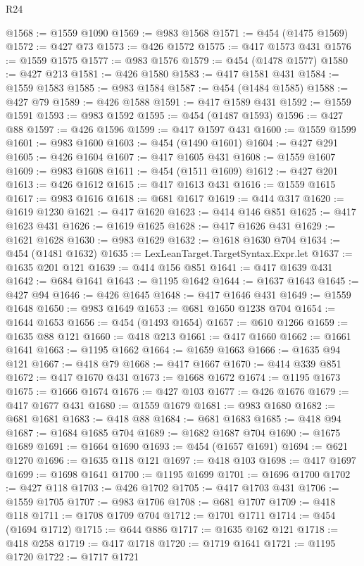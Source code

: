 \begin{lexlean}{R24}
\begin{coremodule}
@1568 := @1559 @1090
@1569 := @983 @1568
@1571 := @454 (@1475 @1569)
@1572 := @427 @73
@1573 := @426 @1572
@1575 := @417 @1573 @431
@1576 := @1559 @1575
@1577 := @983 @1576
@1579 := @454 (@1478 @1577)
@1580 := @427 @213
@1581 := @426 @1580
@1583 := @417 @1581 @431
@1584 := @1559 @1583
@1585 := @983 @1584
@1587 := @454 (@1484 @1585)
@1588 := @427 @79
@1589 := @426 @1588
@1591 := @417 @1589 @431
@1592 := @1559 @1591
@1593 := @983 @1592
@1595 := @454 (@1487 @1593)
@1596 := @427 @88
@1597 := @426 @1596
@1599 := @417 @1597 @431
@1600 := @1559 @1599
@1601 := @983 @1600
@1603 := @454 (@1490 @1601)
@1604 := @427 @291
@1605 := @426 @1604
@1607 := @417 @1605 @431
@1608 := @1559 @1607
@1609 := @983 @1608
@1611 := @454 (@1511 @1609)
@1612 := @427 @201
@1613 := @426 @1612
@1615 := @417 @1613 @431
@1616 := @1559 @1615
@1617 := @983 @1616
@1618 := @681 @1617
@1619 := @414 @317
@1620 := @1619 @1230
@1621 := @417 @1620
@1623 := @414 @146 @851
@1625 := @417 @1623 @431
@1626 := @1619 @1625
@1628 := @417 @1626 @431
@1629 := @1621 @1628
@1630 := @983 @1629
@1632 := @1618 @1630 @704
@1634 := @454 (@1481 @1632)
@1635 := LexLeanTarget.TargetSyntax.Expr.let
@1637 := @1635 @201 @121
@1639 := @414 @156 @851
@1641 := @417 @1639 @431
@1642 := @684 @1641
@1643 := @1195 @1642
@1644 := @1637 @1643
@1645 := @427 @94
@1646 := @426 @1645
@1648 := @417 @1646 @431
@1649 := @1559 @1648
@1650 := @983 @1649
@1653 := @681 @1650 @1238 @704
@1654 := @1644 @1653
@1656 := @454 (@1493 @1654)
@1657 := @610 @1266
@1659 := @1635 @88 @121
@1660 := @418 @213
@1661 := @417 @1660
@1662 := @1661 @1641
@1663 := @1195 @1662
@1664 := @1659 @1663
@1666 := @1635 @94 @121
@1667 := @418 @79
@1668 := @417 @1667
@1670 := @414 @339 @851
@1672 := @417 @1670 @431
@1673 := @1668 @1672
@1674 := @1195 @1673
@1675 := @1666 @1674
@1676 := @427 @103
@1677 := @426 @1676
@1679 := @417 @1677 @431
@1680 := @1559 @1679
@1681 := @983 @1680
@1682 := @681 @1681
@1683 := @418 @88
@1684 := @681 @1683
@1685 := @418 @94
@1687 := @1684 @1685 @704
@1689 := @1682 @1687 @704
@1690 := @1675 @1689
@1691 := @1664 @1690
@1693 := @454 (@1657 @1691)
@1694 := @621 @1270
@1696 := @1635 @118 @121
@1697 := @418 @103
@1698 := @417 @1697
@1699 := @1698 @1641
@1700 := @1195 @1699
@1701 := @1696 @1700
@1702 := @427 @118
@1703 := @426 @1702
@1705 := @417 @1703 @431
@1706 := @1559 @1705
@1707 := @983 @1706
@1708 := @681 @1707
@1709 := @418 @118
@1711 := @1708 @1709 @704
@1712 := @1701 @1711
@1714 := @454 (@1694 @1712)
@1715 := @644 @886
@1717 := @1635 @162 @121
@1718 := @418 @258
@1719 := @417 @1718
@1720 := @1719 @1641
@1721 := @1195 @1720
@1722 := @1717 @1721

\end{coremodule}
\end{lexlean}
